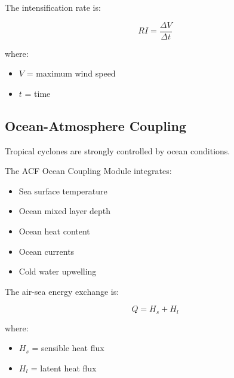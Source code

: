The intensification rate is:

\[
RI=
\frac{\Delta V}{\Delta t}
\]


where:

\begin{itemize}

\item $V$ = maximum wind speed

\item $t$ = time

\end{itemize}



\subsection{Ocean-Atmosphere Coupling}

Tropical cyclones are strongly controlled by ocean conditions.

The ACF Ocean Coupling Module integrates:

\begin{itemize}

\item Sea surface temperature

\item Ocean mixed layer depth

\item Ocean heat content

\item Ocean currents

\item Cold water upwelling

\end{itemize}


The air-sea energy exchange is:

\[
Q=
H_s+H_l
\]


where:

\begin{itemize}

\item $H_s$ = sensible heat flux

\item $H_l$ = latent heat flux

\end{itemize}



